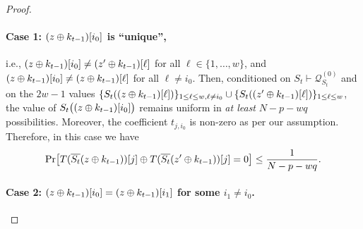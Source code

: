 \begin{proof}
	
	
	
	
	\paragraph{Case 1: $(z\oplus k_{t-1})[i_0]$ is ``unique'',}
	
	i.e., $(z\oplus k_{t-1})[i_0]\neq(z'\oplus k_{t-1})[\ell]$ for all $\ell\in\{1,\ldots,w\}$, and $(z\oplus k_{t-1})[i_0]\neq(z\oplus k_{t-1})[\ell]$ for all $\ell\neq i_0$. Then, conditioned on $S_t\vdash\mathcal{Q}_{S_t}^{(0)}$ and on the $2w-1$ values $\{S_t((z\oplus k_{t-1})[\ell])\}_{1\leq \ell\leq w,\ell\neq i_0}\cup\{S_t((z'\oplus k_{t-1})[\ell])\}_{1\leq \ell\leq w}$, the value of $S_t\big((z\oplus k_{t-1})[i_0]\big)$ remains uniform in {\it at least} $N-p-wq$ possibilities. Moreover, the coefficient $t_{j,i_0}$ is non-zero as per our assumption. Therefore, in this case we have
	\begin{align}
	{\Pr}\big[T(\overline{S_t}(z\oplus k_{t-1}))[j]\oplus T(\overline{S_t}(z'\oplus k_{t-1}))[j]=0\big]\leq\frac{1}{N-p-wq}.
	\label{eq:bound-eq-B33}
	\end{align}
	
	
	\paragraph{Case 2: $(z\oplus k_{t-1})[i_0]=(z\oplus k_{t-1})[i_1]$ for some $i_1\neq i_0$.}
	

\end{proof}

